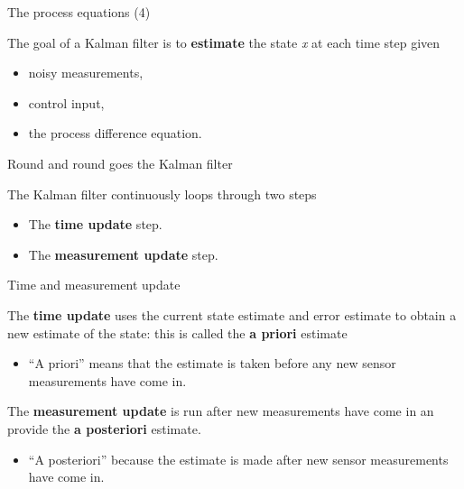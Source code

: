 \documentclass[compress]{beamer}
\providecommand{\tightlist}{%
  \setlength{\itemsep}{0pt}\setlength{\parskip}{0pt}}
\begin{document}
\begin{frame}{The process equations (4)}

The goal of a Kalman filter is to \textbf{estimate} the state \emph{x}
at each time step given

\begin{itemize}
\tightlist
\item
  noisy measurements,
\item
  control input,
\item
  the process difference equation.
\end{itemize}

\end{frame}

\begin{frame}{Round and round goes the Kalman filter}

The Kalman filter continuously loops through two steps

\begin{itemize}
\tightlist
\item
  The \textbf{time update} step.
\item
  The \textbf{measurement update} step.
\end{itemize}

\end{frame}

\begin{frame}{Time and measurement update}

The \textbf{time update} uses the current state estimate and error
estimate to obtain a new estimate of the state: this is called the
\textbf{a priori} estimate

\begin{itemize}
\tightlist
\item
  ``A priori'' means that the estimate is taken before any new sensor
  measurements have come in.
\end{itemize}

The \textbf{measurement update} is run after new measurements have come
in an provide the \textbf{a posteriori} estimate.

\begin{itemize}
\tightlist
\item
  ``A posteriori'' because the estimate is made after new sensor
  measurements have come in.
\end{itemize}

\end{frame}
\end{document}
